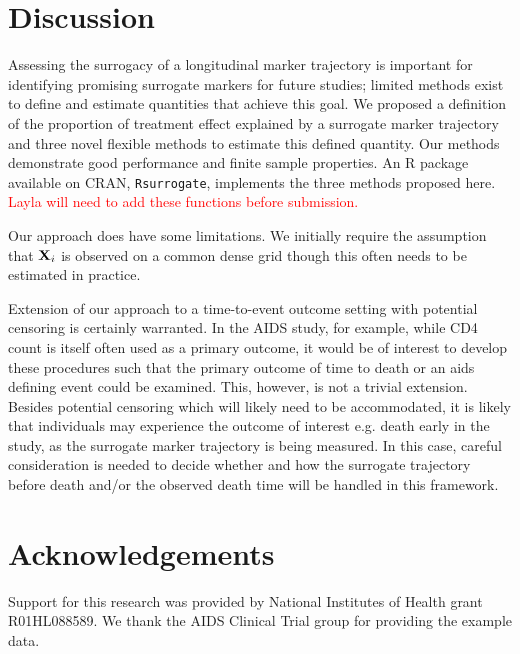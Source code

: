 \documentclass[useAMS,usenatbib,referee]{biom}
\begin{document}
\section{Discussion}\label{discussion}
Assessing the surrogacy of a longitudinal marker trajectory is important for identifying promising surrogate markers for future studies; limited methods exist to define and estimate quantities that achieve this goal. We proposed a definition of the proportion of treatment effect explained by a surrogate marker trajectory and three novel flexible methods to estimate this defined quantity. Our methods demonstrate good performance and finite sample properties. An R package available on CRAN, \texttt{Rsurrogate}, implements the three methods proposed here. \textcolor{red}{Layla will need to add these functions before submission.}

Our approach does have some limitations. We initially require the assumption that ${\bf X}_i$ is observed on a common dense grid though this often needs to be estimated in practice. 

Extension of our approach to a time-to-event outcome setting with potential censoring is certainly warranted. In the AIDS study, for example, while CD4 count is itself often used as a primary outcome, it would be of interest to develop these procedures such that the primary outcome of time to death or an aids defining event could be examined. This, however, is not a trivial extension. Besides potential censoring which will likely need to be accommodated, it is likely that individuals may experience the outcome of interest e.g. death early in the study, as the surrogate marker trajectory is being measured. In this case, careful consideration is needed to decide whether and how the surrogate trajectory before death and/or the observed death time will be handled in this framework.

\section*{Acknowledgements}
Support for this research was provided by National Institutes of Health grant R01HL088589. We thank the AIDS Clinical Trial group for providing the example data. 

\clearpage


\end{document}

